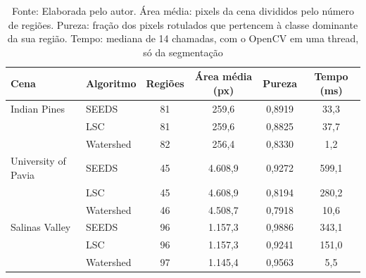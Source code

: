 \begin{table}[!htb]
    \centering
    \small
    \caption{Estrutura das segmentações com os parâmetros padrão}
    \begin{tabular}{|l|l|c|c|c|c|}
        \hline
        \rowcolor[HTML]{C0C0C0}
        \textbf{Cena} & \textbf{Algoritmo} & \textbf{Regiões} & \textbf{Área média (px)} & \textbf{Pureza} & \textbf{Tempo (ms)} \\
        \hline
        Indian Pines & SEEDS & 81 & 259,6 & 0,8919 & 33,3 \\
                     & LSC & 81 & 259,6 & 0,8825 & 37,7 \\
                     & Watershed & 82 & 256,4 & 0,8330 & 1,2 \\
        \hline
        University of Pavia & SEEDS & 45 & 4.608,9 & 0,9272 & 599,1 \\
                            & LSC & 45 & 4.608,9 & 0,8194 & 280,2 \\
                            & Watershed & 46 & 4.508,7 & 0,7918 & 10,6 \\
        \hline
        Salinas Valley & SEEDS & 96 & 1.157,3 & 0,9886 & 343,1 \\
                       & LSC & 96 & 1.157,3 & 0,9241 & 151,0 \\
                       & Watershed & 97 & 1.145,4 & 0,9563 & 5,5 \\
        \hline
    \end{tabular}
    \captionsetup{justification=raggedright}
    \caption*{Fonte: Elaborada pelo autor. Área média: pixels da cena divididos pelo número de regiões. Pureza: fração dos pixels rotulados que pertencem à classe dominante da sua região. Tempo: mediana de 14 chamadas, com o OpenCV em uma thread, só da segmentação}
    \label{tab:estruturaSeg}
\end{table}

